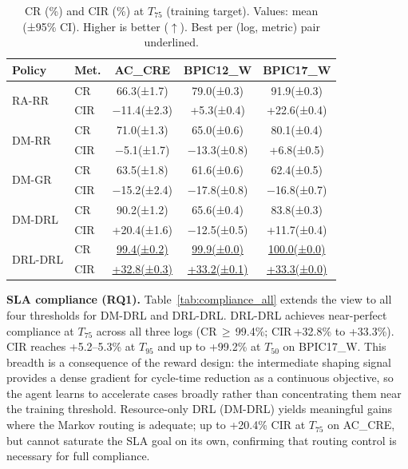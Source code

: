 \documentclass[journal,onecolumn]{IEEEtran}
\begin{document}
\begin{table}[!ht]
\centering\scriptsize
\setlength{\tabcolsep}{2.5pt}
\renewcommand{\arraystretch}{1.1}
\begin{tabular}{ll ccc}
\toprule
\textbf{Policy} & \textbf{Met.} &
\textbf{AC\_CRE} & \textbf{BPIC12\_W} & \textbf{BPIC17\_W} \\
\midrule
\multirow{2}{*}{RA-RR}
  & CR  & 66.3{\tiny(±1.7)} & 79.0{\tiny(±0.3)} & 91.9{\tiny(±0.3)} \\
  & CIR & $-$11.4{\tiny(±2.3)} & +5.3{\tiny(±0.4)} & +22.6{\tiny(±0.4)} \\
\midrule
\multirow{2}{*}{DM-RR}
  & CR  & 71.0{\tiny(±1.3)} & 65.0{\tiny(±0.6)} & 80.1{\tiny(±0.4)} \\
  & CIR & $-$5.1{\tiny(±1.7)} & $-$13.3{\tiny(±0.8)} & +6.8{\tiny(±0.5)} \\
\midrule
\multirow{2}{*}{DM-GR}
  & CR  & 63.5{\tiny(±1.8)} & 61.6{\tiny(±0.6)} & 62.4{\tiny(±0.5)} \\
  & CIR & $-$15.2{\tiny(±2.4)} & $-$17.8{\tiny(±0.8)} & $-$16.8{\tiny(±0.7)} \\
\midrule
\multirow{2}{*}{DM-DRL}
  & CR  & 90.2{\tiny(±1.2)} & 65.6{\tiny(±0.4)} & 83.8{\tiny(±0.3)} \\
  & CIR & +20.4{\tiny(±1.6)} & $-$12.5{\tiny(±0.5)} & +11.7{\tiny(±0.4)} \\
\midrule
\multirow{2}{*}{DRL-DRL}
  & CR  & \underline{99.4{\tiny(±0.2)}} & \underline{99.9{\tiny(±0.0)}} & \underline{100.0{\tiny(±0.0)}} \\
  & CIR & \underline{+32.8{\tiny(±0.3)}} & \underline{+33.2{\tiny(±0.1)}} & \underline{+33.3{\tiny(±0.0)}} \\
\bottomrule
\end{tabular}
\caption[CR and CIR at $T_{75}$]{CR (\%) and CIR (\%) at $T_{75}$ (training target).
Values: mean (±95\% CI). Higher is better ($\uparrow$).
Best per (log, metric) pair underlined.}
\label{tab:compliance_t75}
\end{table}

\noindent\textbf{SLA compliance (RQ1).}
Table~\ref{tab:compliance_all} extends the view to all four
thresholds for DM-DRL and DRL-DRL. DRL-DRL achieves near-perfect
compliance at $T_{75}$ across all three logs
(CR\,$\geq$\,99.4\%; CIR\,+32.8\% to +33.3\%).
CIR reaches +5.2--5.3\% at $T_{95}$ and up to +99.2\% at $T_{50}$
on BPIC17\_W. This breadth is a consequence of the reward design:
the intermediate shaping signal provides a dense gradient for
cycle-time reduction as a continuous objective, so the agent learns
to accelerate cases broadly rather than concentrating them near the
training threshold. Resource-only DRL (DM-DRL) yields meaningful
gains where the Markov routing is adequate; up to +20.4\% CIR at
$T_{75}$ on AC\_CRE, but cannot saturate the SLA goal on its own,
confirming that routing control is necessary for full compliance.
\end{document}
